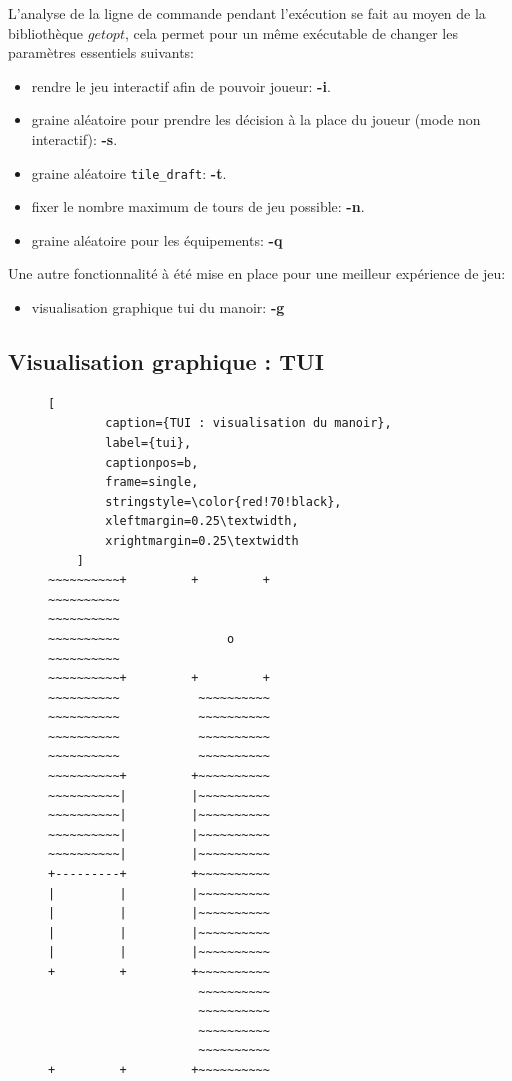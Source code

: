 L'analyse de la ligne de commande pendant l'exécution se fait au moyen de la bibliothèque $getopt$, cela permet pour un même exécutable de changer les paramètres essentiels suivants:
\begin{itemize}
    \item rendre le jeu interactif afin de pouvoir joueur: \textbf{-i}.
    \item graine aléatoire pour prendre les décision à la place du joueur (mode non interactif): \textbf{-s}.
    \item graine aléatoire \texttt{tile\_draft}: \textbf{-t}.
    \item fixer le nombre maximum de tours de jeu possible: \textbf{-n}.
    \item graine aléatoire pour les équipements: \textbf{-q}
\end{itemize}
Une autre fonctionnalité à été mise en place pour une meilleur expérience de jeu:
\begin{itemize}
    \item visualisation graphique tui du manoir: \textbf{-g}
\end{itemize}

\subsection{Visualisation graphique : TUI}

\begin{figure}[H]
    \centering
    \captionsetup[lstlisting]{name=Figure}
    \begin{lstlisting}[
        caption={TUI : visualisation du manoir},
        label={tui},
        captionpos=b,
        frame=single,
        stringstyle=\color{red!70!black},
        xleftmargin=0.25\textwidth,
        xrightmargin=0.25\textwidth
    ]
~~~~~~~~~~+         +         +
~~~~~~~~~~                     
~~~~~~~~~~                     
~~~~~~~~~~               o     
~~~~~~~~~~                     
~~~~~~~~~~+         +         +
~~~~~~~~~~           ~~~~~~~~~~
~~~~~~~~~~           ~~~~~~~~~~
~~~~~~~~~~           ~~~~~~~~~~
~~~~~~~~~~           ~~~~~~~~~~
~~~~~~~~~~+         +~~~~~~~~~~
~~~~~~~~~~|         |~~~~~~~~~~
~~~~~~~~~~|         |~~~~~~~~~~
~~~~~~~~~~|         |~~~~~~~~~~
~~~~~~~~~~|         |~~~~~~~~~~
+---------+         +~~~~~~~~~~
|         |         |~~~~~~~~~~
|         |         |~~~~~~~~~~
|         |         |~~~~~~~~~~
|         |         |~~~~~~~~~~
+         +         +~~~~~~~~~~
                     ~~~~~~~~~~
                     ~~~~~~~~~~
                     ~~~~~~~~~~
                     ~~~~~~~~~~
+         +         +~~~~~~~~~~

    \end{lstlisting}
\end{figure}


